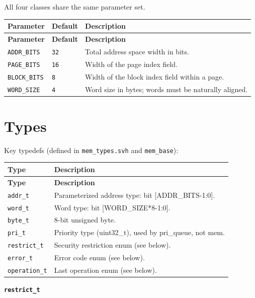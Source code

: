 \documentclass[11pt,letterpaper]{report}
\begin{document}
All four classes share the same parameter set.

\begin{xltabular}{\linewidth}{llX}
\toprule
\textbf{Parameter} & \textbf{Default} & \textbf{Description} \\
\midrule
\endfirsthead
\toprule
\textbf{Parameter} & \textbf{Default} & \textbf{Description} \\
\midrule
\endhead
\bottomrule
\endlastfoot
\texttt{ADDR\_BITS} & \texttt{32} & Total address space width in bits. \\
\texttt{PAGE\_BITS} & \texttt{16} & Width of the page index field. \\
\texttt{BLOCK\_BITS} & \texttt{8} & Width of the block index field within a page. \\
\texttt{WORD\_SIZE} & \texttt{4} & Word size in bytes; words must be naturally aligned. \\
\end{xltabular}

\section{Types}

Key typedefs (defined in \texttt{mem\_types.svh} and \texttt{mem\_base}):

\begin{xltabular}{\linewidth}{lX}
\toprule
\textbf{Type} & \textbf{Description} \\
\midrule
\endfirsthead
\toprule
\textbf{Type} & \textbf{Description} \\
\midrule
\endhead
\bottomrule
\endlastfoot
\texttt{addr\_t} & Parameterized address type: bit [ADDR\_BITS-1:0]. \\
\texttt{word\_t} & Word type: bit [WORD\_SIZE*8-1:0]. \\
\texttt{byte\_t} & 8-bit unsigned byte. \\
\texttt{pri\_t} & Priority type (uint32\_t), used by pri\_queue, not mem. \\
\texttt{restrict\_t} & Security restriction enum (see below). \\
\texttt{error\_t} & Error code enum (see below). \\
\texttt{operation\_t} & Last operation enum (see below). \\
\end{xltabular}

\noindent\textbf{\texttt{restrict\_t}}
\end{document}
